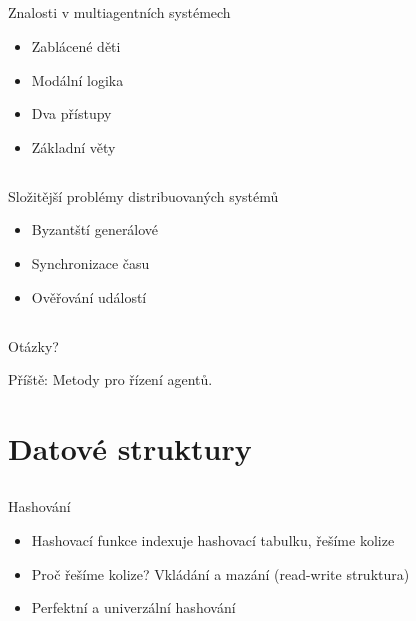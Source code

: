 \documentclass{beamer}
\begin{document}
\subsection{}
\begin{frame}{Znalosti v multiagentních systémech}
\begin{itemize}
\item Zablácené děti
\item Modální logika
\item Dva přístupy
\item Základní věty
\end{itemize}
\end{frame}

\subsection{}
\begin{frame}{Složitější problémy distribuovaných systémů}
\begin{itemize}
\item Byzantští generálové
\item Synchronizace času
\item Ověřování událostí
\end{itemize}
\end{frame}

\subsection{}
\begin{frame}{Otázky?}
\begin{center}
Příště: Metody pro řízení agentů.
\end{center}
\end{frame}

\section{Datové struktury}

\subsection{}
\begin{frame}{Hashování}
\begin{itemize}
\item Hashovací funkce indexuje hashovací tabulku, řešíme kolize
\item Proč řešíme kolize? Vkládání a mazání (read-write struktura)
\item Perfektní a univerzální hashování
\end{itemize}
\end{frame}
\end{document}
